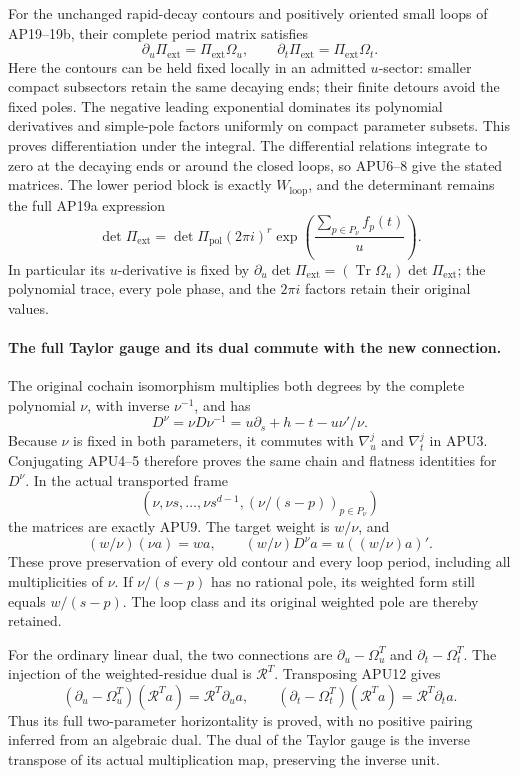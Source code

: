 For the unchanged rapid-decay contours and positively oriented
small loops of AP19--19b, their complete period matrix satisfies
\[
 \partial_u\Pi_{\mathrm{ext}}=\Pi_{\mathrm{ext}}\Omega_u,\qquad
 \partial_t\Pi_{\mathrm{ext}}=\Pi_{\mathrm{ext}}\Omega_t .
 \tag{APU14}
\]
Here the contours can be held fixed locally in an admitted
\(u\)-sector: smaller compact subsectors retain the same decaying
ends; their finite detours avoid the fixed poles.  The negative
leading exponential dominates its polynomial derivatives and
simple-pole factors uniformly on compact parameter subsets.
This proves differentiation under the integral.  The differential
relations integrate to zero at the decaying ends or around the
closed loops, so APU6--8 give the stated matrices.
The lower period block is exactly \(W_{\mathrm{loop}}\), and
the determinant remains the full AP19a expression
\[
 \det\Pi_{\mathrm{ext}}
   =\det\Pi_{\mathrm{pol}}(2\pi i)^r
                 \exp\!\left(\frac{\sum_{p\in P_\nu}f_p(t)}u\right).
 \tag{APU15}
\]
In particular its \(u\)-derivative is fixed by
\(\partial_u\det\Pi_{\mathrm{ext}}
=(\operatorname{Tr}\Omega_u)\det\Pi_{\mathrm{ext}}\);
the polynomial trace, every pole phase, and the \(2\pi i\) factors
retain their original values.

\paragraph{The full Taylor gauge and its dual commute with the new connection.}
The original cochain isomorphism multiplies both degrees by the
complete polynomial \(\nu\), with inverse \(\nu^{-1}\), and has
\[
 D^\nu=\nu D\nu^{-1}
       =u\partial_s+h-t-u\nu'/\nu .
\]
Because \(\nu\) is fixed in both parameters, it commutes with
\(\nabla_u^j\) and \(\nabla_t^j\) in APU3.  Conjugating APU4--5
therefore proves the same chain and flatness identities for
\(D^\nu\).  In the actual transported frame
\[
 (\nu,\nu s,\ldots,\nu s^{d-1},(\nu/(s-p))_{p\in P_\nu})
\]
the matrices are exactly APU9.  The target weight is \(w/\nu\),
and
\[
 (w/\nu)(\nu a)=wa,\qquad
 (w/\nu)D^\nu a=u((w/\nu)a)' .
 \tag{APU16}
\]
These prove preservation of every old contour and every loop
period, including all multiplicities of \(\nu\).  If \(\nu/(s-p)\)
has no rational pole, its weighted form still equals \(w/(s-p)\).
The loop class and its original weighted pole are thereby retained.

For the ordinary linear dual, the two connections are
\(\partial_u-\Omega_u^T\) and
\(\partial_t-\Omega_t^T\).
The injection of the weighted-residue dual is
\(\mathcal R^T\).  Transposing APU12 gives
\[
 (\partial_u-\Omega_u^T)(\mathcal R^T a)
       =\mathcal R^T\partial_u a,\qquad
 (\partial_t-\Omega_t^T)(\mathcal R^T a)
       =\mathcal R^T\partial_t a .
 \tag{APU17}
\]
Thus its full two-parameter horizontality is proved, with no
positive pairing inferred from an algebraic dual.
The dual of the Taylor gauge is the inverse transpose of its
actual multiplication map, preserving the inverse unit.


